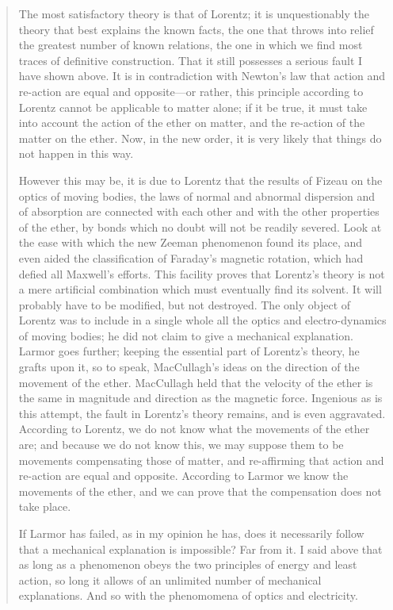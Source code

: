 \documentclass{article}
\begin{document}
 \begin{quote}
     The most satisfactory theory is that of Lorentz; it is unquestionably the theory that best explains the known facts, the one that throws into relief the greatest number of known relations, the one in which we find most traces of definitive construction.  That it still possesses a serious fault I have shown above.  It is in contradiction with Newton's law that action and re-action are equal and opposite---or rather, this principle according to Lorentz cannot be applicable to matter alone; if it be true, it must take into account the action of the ether on matter, and the re-action of the matter on the ether.  Now, in the new order, it is very likely that things do not happen in this way.  
     
     However this may be, it is due to Lorentz that the results of Fizeau on the optics of moving bodies, the laws of normal and abnormal dispersion and of absorption are connected with each other and with the other properties of the ether, by bonds which no doubt will not be readily severed.  Look at the ease with which the new Zeeman phenomenon found its place, and even aided the classification of Faraday's magnetic rotation, which had defied all Maxwell's efforts.  This facility proves that Lorentz's theory is not a mere artificial combination which must eventually find its solvent.  It will probably have to be modified, but not destroyed.  
     The only object of Lorentz was to include in a single whole all the optics and electro-dynamics of moving bodies; he did not claim to give a mechanical explanation.  Larmor goes further; keeping the essential part of Lorentz's theory, he grafts upon it, so to speak, MacCullagh's ideas on the direction of the movement of the ether.  MacCullagh held that the velocity of the ether is the same in magnitude and direction as the magnetic force.  Ingenious as is this attempt, the fault in Lorentz's theory remains, and is even aggravated.  According to Lorentz, we do not know what the movements of the ether are; and because we do not know this, we may suppose them to be movements compensating those of matter, and re-affirming that action and re-action are equal and opposite.  According to Larmor we know the movements of the ether, and we can prove that the compensation does not take place.  
     
     If Larmor has failed, as in my opinion he has, does it necessarily follow that a mechanical explanation is impossible?  Far from it.  I said above that as long as a phenomenon obeys the two principles of energy and least action, so long it allows of an unlimited number of mechanical explanations.  And so with the phenomomena of optics and electricity.
     

\end{quote}
\end{document}
